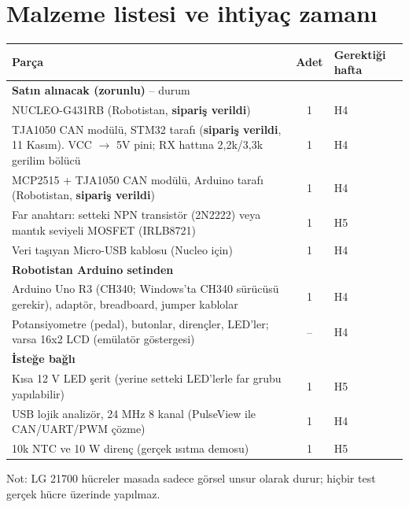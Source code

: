 \documentclass[11pt,a4paper]{article}
\begin{document}
\section{Malzeme listesi ve ihtiyaç zamanı}\label{sec:bom}
\begin{center}
\renewcommand{\arraystretch}{1.2}
\begin{tabularx}{\textwidth}{X c l}
\toprule
Parça & Adet & Gerektiği hafta \\
\midrule
\textbf{Satın alınacak (zorunlu)} -- durum & & \\
NUCLEO-G431RB (Robotistan, \textbf{sipariş verildi}) & 1 & H4 \\
TJA1050 CAN modülü, STM32 tarafı (\textbf{sipariş verildi}, 11 Kasım). VCC $\rightarrow$ 5V pini; RX hattına 2,2k/3,3k gerilim bölücü & 1 & H4 \\
MCP2515 + TJA1050 CAN modülü, Arduino tarafı (Robotistan, \textbf{sipariş verildi}) & 1 & H4 \\
Far anahtarı: setteki NPN transistör (2N2222) veya mantık seviyeli MOSFET (IRLB8721) & 1 & H5 \\
Veri taşıyan Micro-USB kablosu (Nucleo için) & 1 & H4 \\
\midrule
\textbf{Robotistan Arduino setinden} & & \\
Arduino Uno R3 (CH340; Windows'ta CH340 sürücüsü gerekir), adaptör, breadboard, jumper kablolar & 1 & H4 \\
Potansiyometre (pedal), butonlar, dirençler, LED'ler; varsa 16x2 LCD (emülatör göstergesi) & -- & H4 \\
\midrule
\textbf{İsteğe bağlı} & & \\
Kısa 12 V LED şerit (yerine setteki LED'lerle far grubu yapılabilir) & 1 & H5 \\

USB lojik analizör, 24 MHz 8 kanal (PulseView ile CAN/UART/PWM çözme) & 1 & H4 \\
10k NTC ve 10 W direnç (gerçek ısıtma demosu) & 1 & H5 \\
\bottomrule
\end{tabularx}
\end{center}
Not: LG 21700 hücreler masada sadece görsel unsur olarak durur; hiçbir test gerçek hücre üzerinde yapılmaz.

\end{document}
